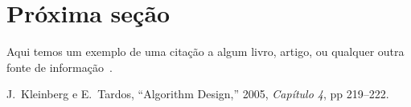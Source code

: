 \documentclass[11pt]{article}
\begin{document}
\section{Próxima seção}

Aqui temos um exemplo de uma citação a algum livro, artigo, ou qualquer outra fonte de informação~\cite{KT05}.


\begin{thebibliography}{9}

{\sc J.~Kleinberg} e {\sc E.~Tardos}, 
``Algorithm Design,'' 2005,
{\it Capítulo 4}, pp 219--222.

\end{thebibliography}

\end{document}

